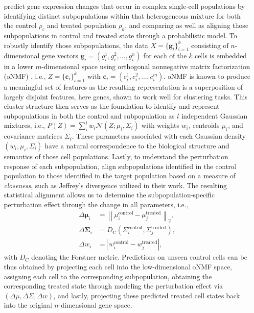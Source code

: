 \citet{suppchen2020dissecting} predict gene expression changes that occur in complex single-cell populations by identifying distinct subpopulations within that heterogeneous mixture for both the control $\rho_c$ and treated population $\rho_k$, and comparing as well as aligning those subpopulations in control and treated state through a probabilistic model.
To robustly identify those subpopulations, the data $X = \{ \mathbf{g}_i \}_{i=1}^k$ consisting of $n$-dimensional gene vectors $\mathbf{g}_i = (g_i^1, g_i^2, \dots, g_i^n)$ for each of the $k$ cells is embedded in a lower $m$-dimensional space using orthogonal nonnegative matrix factorization (oNMF) \citep{suppasteris2015orthogonal}, i.e., $Z = \{ \mathbf{c}_i \}_{i=1}^k$ with $\mathbf{c}_i = (c_i^1, c_i^2, \dots, c_i^m)$. oNMF is known to produce a meaningful set of features as the resulting representation is a superposition of largely disjoint features, here genes, shown to work well for clustering tasks.
This cluster structure then serves as the foundation to identify and represent subpopulations in both the control and subpopulation as $l$ independent Gaussian mixtures, i.e., $P(Z) = \sum_i^l w_i \mathcal{N}(Z; \mu_i, \Sigma_i)$ with weights $w_i$, centroids $\mu_i$, and covariance matrices $\Sigma_i$.
These parameters associated with each Gaussian density $(w_i, \mu_i, \Sigma_i)$ have a natural correspondence to the biological structure and semantics of those cell populations.
Lastly, to understand the perturbation response of each subpopulation, \citet{suppchen2020dissecting} align subpopulations identified in the control population to those identified in the target population based on a measure of \emph{closeness}, such as Jeffrey's divergence utilized in their work. The resulting statistical alignment allows us to determine the subpopulation-specific perturbation effect through the change in all parameters, i.e.,
\begin{align*}
	\Delta \boldsymbol{\mu}_i &=\left\|\mu_i^{\text {control}}-\mu_j^{\text {treated}}\right\|_2, \\
	\Delta \boldsymbol{\Sigma}_i &=D_{\mathrm{C}}\left(\Sigma_i^{\text {control}}, \Sigma_j^{\text {treated}}\right), \\
	\Delta w_i &=\left|w_i^{\text {control}}-w_j^{\text {treated}}\right|,
\end{align*}
with $D_C$ denoting the Forstner metric. Predictions on unseen control cells can be thus obtained by projecting each cell into the low-dimensional oNMF space, assigning each cell to the corresponding subpopulation, obtaining the corresponding treated state through modeling the perturbation effect via $(\Delta \mu, \Delta \Sigma, \Delta w)$, and lastly, projecting these predicted treated cell states back into the original $n$-dimensional gene space.

